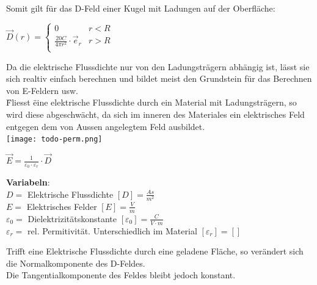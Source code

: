 					Somit gilt für das D-Feld einer Kugel mit Ladungen auf der Oberfläche: \\
\begin{center}

					$
					\vec{D}(r) =
					\begin{cases}
      0 & r < R \\
      \frac{20 C}{4 \pi r^2} \cdot  \vec{e}_r & r > R \\
   \end{cases}$

	 \end{center}
					\iend




					Da die elektrische Flussdichte nur von den Ladungsträgern abhängig ist, lässt sie sich realtiv einfach berechnen und bildet meist den Grundstein für
					das Berechnen von E-Feldern usw. \\
					\" Fliesst \" eine elektrische Flussdichte durch ein Material mit Ladungsträgern, so wird diese abgeschwächt, da sich im inneren des Materiales ein
					elektrisches Feld entgegen dem von Aussen angelegtem Feld ausbildet. \\
					\texttt{[image: todo-perm.png]}

					\begingl
					\begin{center}
						\formulaBegin
						$ \vec{E} = \frac{1}{\varepsilon_0 \cdot \varepsilon_r} \cdot \vec{D}$
						\formulaEnd
					\end{center}
					\textbf{Variabeln}: \\
					$D = $ Elektrische Flussdichte $ [D] = \frac{As}{m^2}$ \\
					$ E = $ Elektrisches Felder $[E] = \frac{V}{m}$ \\
					$ \varepsilon_0 = $ Dielektrizitätskonstante $ [\varepsilon_0] = \frac{C}{V\cdot m}$ \\
					$ \varepsilon_r = $ rel. Permitivität. Unterschiedlich im Material $ [\varepsilon_r] = [ ]$ \\

					\iend



					\beginip
					Trifft eine Elektrische Flussdichte durch eine geladene Fläche, so verändert sich die Normalkomponente des D-Feldes. \\
					Die Tangentialkomponente des Feldes bleibt jedoch konstant. \\

